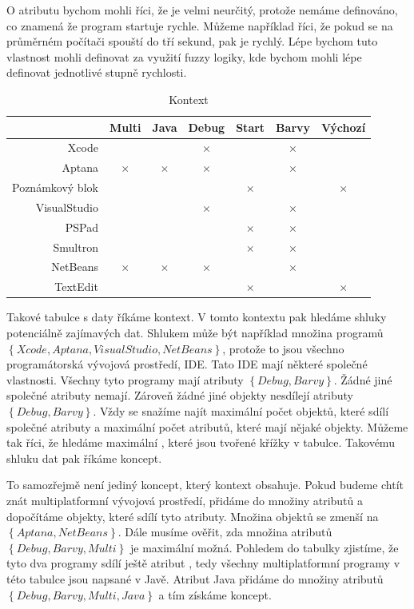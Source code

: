 \documentclass[12pt]{article}
\newcommand{\yes}{$\times$}
\newcommand{\adds}[1]{\left\{#1\right\}}
\begin{document}
O atributu  bychom mohli říci, že je velmi neurčitý, protože nemáme definováno, co znamená že program startuje rychle. Můžeme například říci, že pokud se na průměrném počítači spouští do tří sekund, pak je rychlý. Lépe bychom tuto vlastnost mohli definovat za využití fuzzy logiky, kde bychom mohli lépe definovat jednotlivé stupně rychlosti. 

\begin{table}
\begin{tabular}{r|cccccc}
\toprule
&Multi&Java&Debug&Start&Barvy&Výchozí\\
\midrule
Xcode&&&\yes&&\yes\\
Aptana&\yes&\yes&\yes&&\yes\\
Poznámkový blok&&&&\yes&&\yes\\
VisualStudio&&&\yes&&\yes\\
PSPad&&&&\yes&\yes\\
Smultron&&&&\yes&\yes\\
NetBeans&\yes&\yes&\yes&&\yes\\
TextEdit&&&&\yes&&\yes\\
\bottomrule
\end{tabular}
\caption{Kontext} \label{tab.con1}
\end{table}

Takové tabulce s daty říkáme kontext. V tomto kontextu pak hledáme shluky potenciálně zajímavých dat. Shlukem může být například množina programů $\adds{Xcode, Aptana, VisualStudio, NetBeans}$, protože to jsou všechno programátorská vývojová prostředí, IDE. Tato IDE mají některé společné vlastnosti. Všechny tyto programy mají atributy $\adds{Debug, Barvy}$. Žádné jiné společné atributy nemají. Zároveň žádné jiné objekty nesdílejí atributy $\adds{Debug, Barvy}$. Vždy se snažíme najít maximální počet objektů, které sdílí společné atributy a maximální počet atributů, které mají nějaké objekty. Můžeme tak říci, že hledáme maximální , které jsou tvořené křížky v tabulce. Takovému shluku dat pak říkáme koncept. 

To samozřejmě není jediný koncept, který kontext obsahuje. Pokud budeme chtít znát multiplatformní vývojová prostředí, přidáme do množiny atributů  a dopočítáme objekty, které sdílí tyto atributy. Množina objektů se zmenší na $\adds{Aptana, NetBeans}$. Dále musíme ověřit, zda množina atributů $\adds{Debug, Barvy, Multi}$ je maximální možná. Pohledem do tabulky zjistíme, že tyto dva programy sdílí ještě atribut , tedy všechny multiplatformní programy v této tabulce jsou napsané v Javě. Atribut Java přidáme do množiny atributů $\adds{Debug, Barvy, Multi, Java}$ a tím získáme koncept.
\end{document}
